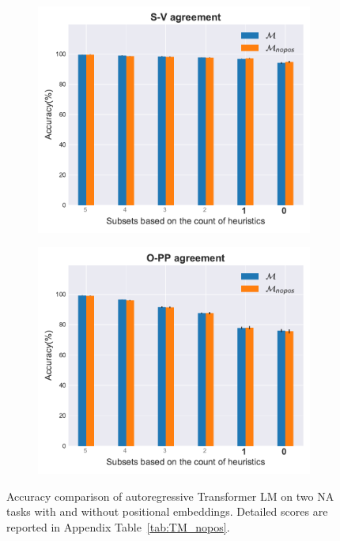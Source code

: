 \begin{figure}[ht]
    \centering
    \begin{subfigure}[b]{0.49\textwidth}
        \includegraphics[width=\textwidth]{figures/tm-nopos-subj-v.pdf}
    \end{subfigure}
    \hfill
    \begin{subfigure}[b]{0.49\textwidth}
        \includegraphics[width=\textwidth]{figures/tm-nopos-o-pp.pdf}
    \end{subfigure}
    \caption{Accuracy comparison of autoregressive Transformer LM on two NA tasks with and without positional embeddings. Detailed scores are reported in Appendix Table~\ref{tab:TM_nopos}. \label{fig:tm_nopos_NA_tasks}}
\end{figure}

